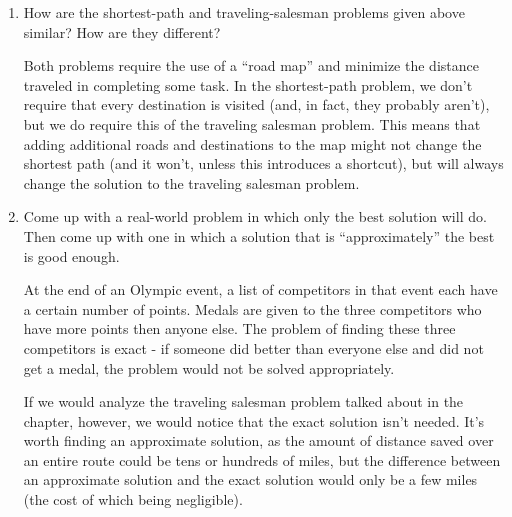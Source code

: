 \documentclass[Chapter01]{subfiles}
\begin{document}
\begin{enumerate}
		\item How are the shortest-path and traveling-salesman problems given above similar? How are they different?
		\begin{answer}
			Both problems require the use of a ``road map'' and minimize the distance traveled in completing some task. In the shortest-path problem, we don't require that every destination is visited (and, in fact, they probably aren't), but we do require this of the traveling salesman problem. This means that adding additional roads and destinations to the map might not change the shortest path (and it won't, unless this introduces a shortcut), but will always change the solution to the traveling salesman problem.
		\end{answer}

		\item Come up with a real-world problem in which only the best solution will do. Then come up with one in which a solution that is ``approximately'' the best is good enough.
		\begin{answer}
			At the end of an Olympic event, a list of competitors in that event each have a certain number of points. Medals are given to the three competitors who have more points then anyone else. The problem of finding these three competitors is exact - if someone did better than everyone else and did not get a medal, the problem would not be solved appropriately.
			
			If we would analyze the traveling salesman problem talked about in the chapter, however, we would notice that the exact solution isn't needed. It's worth finding an approximate solution, as the amount of distance saved over an entire route could be tens or hundreds of miles, but the difference between an approximate solution and the exact solution would only be a few miles (the cost of which being negligible).
		\end{answer}
	\end{enumerate}
\end{document}
